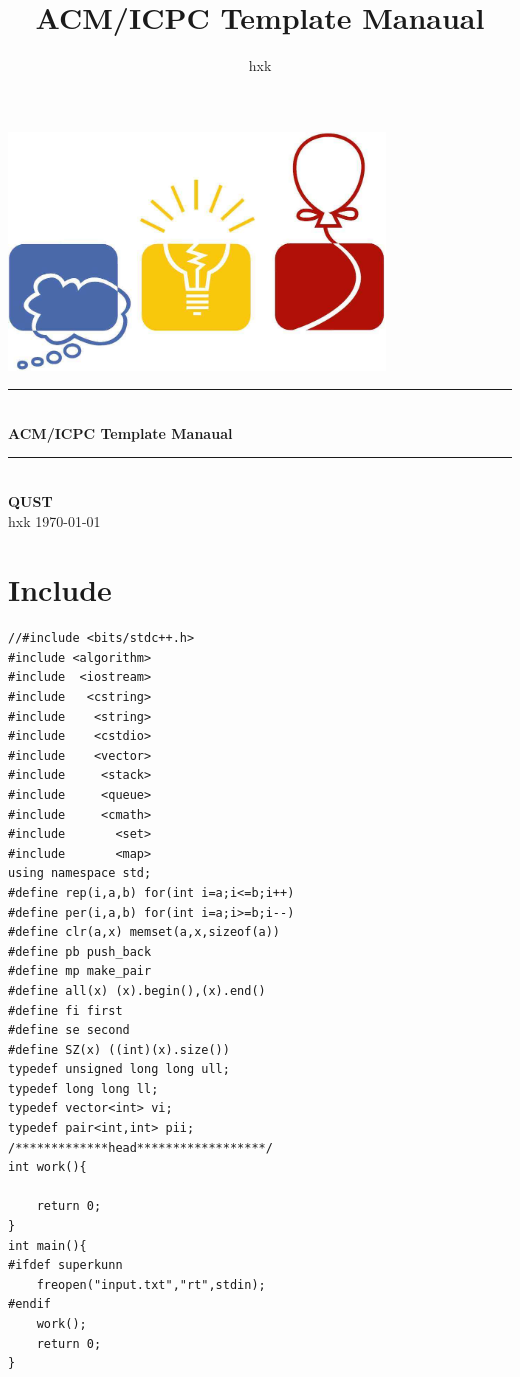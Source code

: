\documentclass[twoside]{article}
\title{ACM/ICPC Template Manaual}
\author{hxk}
\newcommand{\HRule}{\rule{\linewidth}{0.5mm}}
\begin{document}
\small
\begin{titlepage}
\begin{center}
\vspace*{0.5cm}\includegraphics[width=0.75\textwidth]{logo.jpg} \\ [2cm]
\HRule \\ [1cm]
\textbf{\Huge{ACM/ICPC Template Manaual}} \\ [0.5cm]
\HRule \\ [4cm]
\textbf{\Huge{QUST}} \\ [1cm]
\LARGE{hxk}
\vfill
\Large{\today}
\end{center}
\clearpage
\end{titlepage}
\tableofcontents\clearpage
\pagestyle{fancy}
\lfoot{}
\cfoot{\thepage}\rfoot{}
\setcounter{section}{-1}
\setcounter{page}{1}
\clearpage\section{Include}
\begin{lstlisting}
//#include <bits/stdc++.h>
#include <algorithm>
#include  <iostream>
#include   <cstring>
#include    <string>
#include    <cstdio>
#include    <vector>
#include     <stack>
#include     <queue>
#include     <cmath>
#include       <set>
#include       <map>
using namespace std;
#define rep(i,a,b) for(int i=a;i<=b;i++)
#define per(i,a,b) for(int i=a;i>=b;i--)
#define clr(a,x) memset(a,x,sizeof(a))
#define pb push_back
#define mp make_pair
#define all(x) (x).begin(),(x).end()
#define fi first
#define se second
#define SZ(x) ((int)(x).size())
typedef unsigned long long ull;
typedef long long ll;
typedef vector<int> vi;
typedef pair<int,int> pii;
/*************head******************/
int work(){
    
    return 0;
}
int main(){
#ifdef superkunn
    freopen("input.txt","rt",stdin);
#endif
    work();
    return 0;
}
\end{lstlisting}
\end{document}
